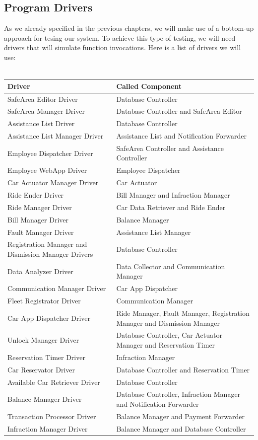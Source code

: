 \documentclass{article}
\begin{document}
\subsection{Program Drivers}
As we already specified in the previous chapters, we will make use of a bottom-up approach for tesing our system. To achieve this type of testing, we will need drivers that will simulate function invocations.
Here is a list of drivers we will use: \\\\
\begin{tabular}{ |p{5cm}|p{7cm}| }
  \hline
  \textbf{Driver} & \textbf{Called Component} \\
  \hline
  SafeArea Editor Driver & Database Controller\\
  \hline
  SafeArea Manager Driver & Database Controller and SafeArea Editor \\
  \hline
  Assistance List Driver & Database Controller \\
  \hline
  Assistance List Manager Driver & Assistance List and Notification Forwarder\\
  \hline
  Employee Dispatcher Driver & SafeArea Controller and Assistance Controller\\
  \hline
  Employee WebApp Driver & Employee Dispatcher\\
  \hline
 Car Actuator Manager Driver  & Car Actuator\\
  \hline
  Ride Ender Driver & Bill Manager and Infraction Manager\\
  \hline
  Ride Manager Driver & Car Data Retriever and Ride Ender\\
  \hline
  Bill Manager Driver & Balance Manager\\
  \hline
  Fault Manager Driver & Assistance List Manager\\
  \hline
  Registration Manager and Dismission Manager Drivers & Database Controller\\
  \hline
  Data Analyzer Driver & Data Collector and Communication Manager\\
  \hline
  Communication Manager Driver & Car App Dispatcher\\
  \hline
  Fleet Registrator Driver & Communication Manager\\
  \hline
  Car App Dispatcher Driver & Ride Manager, Fault Manager, Registration Manager and Dismission Manager\\
  \hline
  Unlock Manager Driver & Database Controller, Car Actuator Manager and Reservation Timer\\
  \hline
  Reservation Timer Driver & Infraction Manager\\
  \hline
  Car Reservator Driver & Database Controller and Reservation Timer\\
  \hline
  Available Car Retriever Driver & Database Controller\\
  \hline
  Balance Manager Driver & Database Controller, Infraction Manager and Notification Forwarder\\
  \hline
  Transaction Processor Driver & Balance Manager and Payment Forwarder\\
  \hline
  Infraction Manager Driver & Balance Manager and Database Controller\\
  \hline
\end{tabular}
\end{document}
